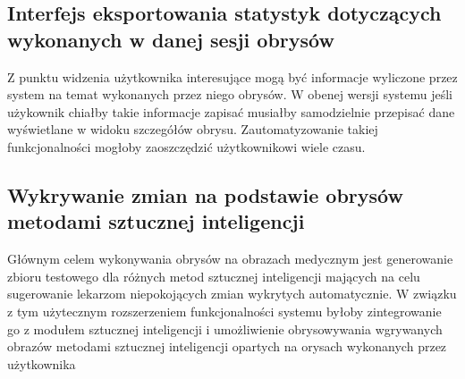 \documentclass[a4paper,11pt,twoside]{report}
\theoremstyle{definition}
\begin{document}
\subsection {Interfejs eksportowania statystyk dotyczących wykonanych w danej sesji obrysów}

Z punktu widzenia użytkownika interesujące mogą być informacje wyliczone przez system na temat wykonanych przez niego obrysów. W obenej wersji systemu jeśli użykownik chiałby takie informacje zapisać musiałby samodzielnie przepisać dane wyświetlane w widoku szczegółów obrysu. Zautomatyzowanie takiej funkcjonalności mogłoby zaoszczędzić użytkownikowi wiele czasu.

\subsection {Wykrywanie zmian na podstawie obrysów metodami sztucznej inteligencji}

Głównym celem wykonywania obrysów na obrazach medycznym jest generowanie zbioru testowego dla różnych metod sztucznej inteligencji mających na celu sugerowanie lekarzom niepokojących zmian wykrytych automatycznie. W związku z tym użytecznym rozszerzeniem funkcjonalności systemu byłoby zintegrowanie go z modułem sztucznej inteligencji i umożliwienie obrysowywania wgrywanych obrazów metodami sztucznej inteligencji opartych na orysach wykonanych przez użytkownika





\end{document}
